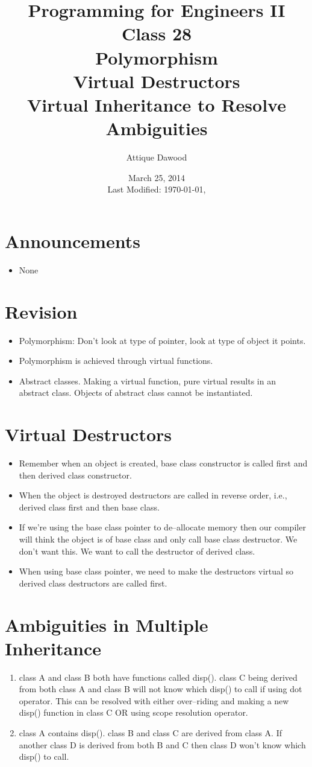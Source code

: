 \documentclass[12pt,a4paper]{article}
\title{\vspace{-2cm}Programming for Engineers II\\Class 28\\Polymorphism\\Virtual Destructors\\Virtual Inheritance to Resolve Ambiguities}
\author{Attique Dawood}
\date{March 25, 2014\\[0.2cm] Last Modified: \today, \currenttime}
\begin{document}
\maketitle
\section{Announcements}
\begin{itemize}
\item None
\end{itemize}
\section{Revision}
\begin{itemize}
\item Polymorphism: Don't look at type of pointer, look at type of object it points.
\item Polymorphism is achieved through virtual functions.
\item Abstract classes. Making a virtual function, pure virtual results in an abstract class. Objects of abstract class cannot be instantiated.
\end{itemize}
\section{Virtual Destructors}
\begin{itemize}
\item Remember when an object is created, base class constructor is called first and then derived class constructor. \item When the object is destroyed destructors are called in reverse order, i.e., derived class first and then base class.
\item If we're using the base class pointer to de--allocate memory then our compiler will think the object is of base class and only call base class destructor. We don't want this. We want to call the destructor of derived class.
\item When using base class pointer, we need to make the destructors virtual so derived class destructors are called first.
\end{itemize}
\section{Ambiguities in Multiple Inheritance}
\begin{enumerate}
\item class A and class B both have functions called disp(). class C being derived from both class A and class B will not know which disp() to call if using dot operator. This can be resolved with either over--riding and making a new disp() function in class C OR using scope resolution operator.
\item class A contains disp(). class B and class C are derived from class A. If another class D is derived from both B and C then class D won't know which disp() to call.
\end{enumerate}
\end{document}
